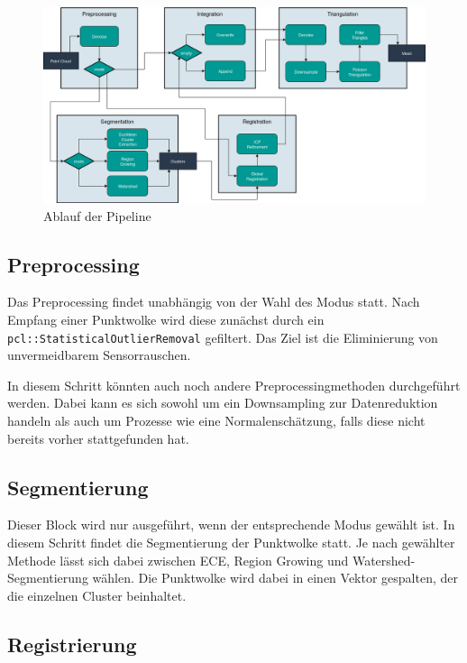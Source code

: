 \begin{figure}[ht]
    \centering
	\includegraphics[width=\textwidth]{images/pipeline.png}
	\caption{Ablauf der Pipeline}
	\label{fig:pipeline}
\end{figure}


\subsection{Preprocessing}
\label{subsec:pipeline-preprocessing}

Das Preprocessing findet unabhängig von der Wahl des Modus statt.
Nach Empfang einer Punktwolke wird diese zunächst durch ein \texttt{pcl::StatisticalOutlierRemoval} gefiltert.
Das Ziel ist die Eliminierung von unvermeidbarem Sensorrauschen.

In diesem Schritt könnten auch noch andere Preprocessingmethoden durchgeführt werden.
Dabei kann es sich sowohl um ein Downsampling zur Datenreduktion handeln als auch um Prozesse wie eine Normalenschätzung, falls diese nicht bereits vorher stattgefunden hat.


\subsection{Segmentierung}
\label{subsec:pipeline-segmentierung}

Dieser Block wird nur ausgeführt, wenn der entsprechende Modus gewählt ist.
In diesem Schritt findet die Segmentierung der Punktwolke statt.
Je nach gewählter Methode lässt sich dabei zwischen \ac{ECE}, Region Growing und Watershed-Segmentierung wählen.
Die Punktwolke wird dabei in einen Vektor gespalten, der die einzelnen Cluster beinhaltet.


\subsection{Registrierung}
\label{subsec:pipeline-registrierung}

